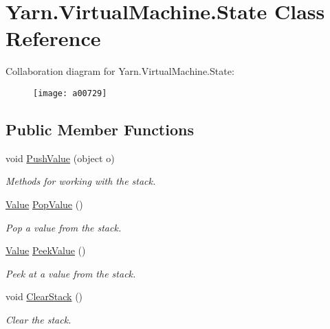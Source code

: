 \hypertarget{a00167}{\section{Yarn.\-Virtual\-Machine.\-State Class Reference}
\label{a00167}
}


Collaboration diagram for Yarn.\-Virtual\-Machine.\-State\-:
\nopagebreak
\begin{figure}[H]
\begin{center}
\leavevmode
\texttt{[image: a00729]}
\end{center}
\end{figure}
\subsection*{Public Member Functions}
\begin{DoxyCompactItemize}
\item 
void \hyperlink{a00167_aace44f5b85b9f746fede834becda4a8e}{Push\-Value} (object o)
\begin{DoxyCompactList}\small\item\em Methods for working with the stack. \end{DoxyCompactList}\item 
\hyperlink{a00189}{Value} \hyperlink{a00167_a36881a888ea2839d74c3d4e7c199f4ee}{Pop\-Value} ()
\begin{DoxyCompactList}\small\item\em Pop a value from the stack. \end{DoxyCompactList}\item 
\hyperlink{a00189}{Value} \hyperlink{a00167_a54fd5b64ec94e937e771846167242dc2}{Peek\-Value} ()
\begin{DoxyCompactList}\small\item\em Peek at a value from the stack. \end{DoxyCompactList}\item 
void \hyperlink{a00167_a9c787097fbbbbf1680e4960cda092535}{Clear\-Stack} ()
\begin{DoxyCompactList}\small\item\em Clear the stack. \end{DoxyCompactList}\end{DoxyCompactItemize}
